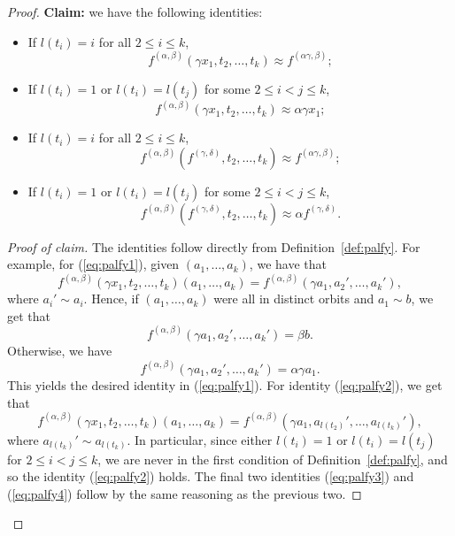 \documentclass{article}
\theoremstyle{remark}
\theoremstyle{definition}
\begin{document}
\begin{proof}
\textbf{Claim:} we have the following identities:
\begin{itemize}
    \item If $l(t_i)=i$ for all $2\leq i\leq k$,
    \begin{equation}\label{eq:palfy1}
        f^{(\alpha, \beta)}(\gamma x_1, t_2, \dots, t_k)\approx f^{(\alpha \gamma, \beta)};
    \end{equation}
    \item If $l(t_i)=1$ or $l(t_i)=l(t_j)$ for some $2\leq i<j\leq k$, 
    \begin{equation}\label{eq:palfy2}
        f^{(\alpha, \beta)}(\gamma x_1, t_2, \dots, t_k)\approx \alpha\gamma x_1;
    \end{equation}
    \item If $l(t_i)=i$ for all $2\leq i\leq k$,
    \begin{equation}\label{eq:palfy3}
        f^{(\alpha, \beta)}(f^{(\gamma, \delta)}, t_2, \dots, t_k)\approx f^{(\alpha \gamma, \beta)};
    \end{equation}
     \item If $l(t_i)=1$ or $l(t_i)=l(t_j)$ for some $2\leq i<j\leq k$, 
    \begin{equation}\label{eq:palfy4}
        f^{(\alpha, \beta)}(f^{(\gamma, \delta)}, t_2, \dots, t_k)\approx \alpha f^{(\gamma, \delta)}.
    \end{equation}
\end{itemize}
\begin{proof}[Proof of claim] The identities follow directly from Definition~\ref{def:palfy}. For example, for (\ref{eq:palfy1}), given $(a_1, \dots, a_k)$, we have that
\[f^{(\alpha, \beta)}(\gamma x_1, t_2, \dots, t_k)(a_1, \dots, a_k)=f^{(\alpha, \beta)}(\gamma a_1, a_2', \dots, a_k'),\]
where $a_i'\sim a_i$. Hence, if $(a_1, \dots, a_k)$ were all in distinct orbits and $a_1\sim b$, we get that 
\[f^{(\alpha, \beta)}(\gamma a_1, a_2', \dots, a_k')=\beta b.\]
Otherwise, we have
\[f^{(\alpha, \beta)}(\gamma a_1, a_2', \dots, a_k')=\alpha\gamma a_1.\]
This yields the desired identity in (\ref{eq:palfy1}). For identity (\ref{eq:palfy2}), we get that 
\[f^{(\alpha, \beta)}(\gamma x_1, t_2, \dots, t_k)(a_1, \dots, a_k)=f^{(\alpha, \beta)}(\gamma a_1, a_{l(t_2)}', \dots, a_{l(t_k)}'),\]
where $a_{l(t_k)}'\sim a_{l(t_k)}$. In particular, since either $l(t_i)=1$ or $l(t_i)=l(t_j)$ for $2\leq i<j\leq k$, we are never in the first condition of Definition~\ref{def:palfy}, and so the identity (\ref{eq:palfy2}) holds. The final two identities (\ref{eq:palfy3}) and (\ref{eq:palfy4}) follow by the same reasoning as the previous two.
\end{proof}
\end{proof}
\end{document}
